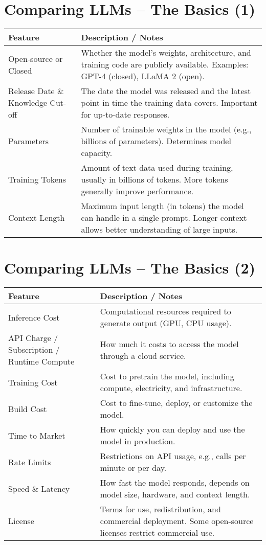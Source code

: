 \documentclass[a4paper, 12pt]{article}
\begin{document}
\section*{Comparing LLMs -- The Basics (1)}

\begin{tabularx}{\textwidth}{|>{\hsize}L|>{\hsize}L|}
\hline
\textbf{Feature} & \textbf{Description / Notes} \\
\hline
Open-source or Closed & Whether the model’s weights, architecture, and training code are publicly available. Examples: GPT-4 (closed), LLaMA 2 (open). \\
\hline
Release Date \& Knowledge Cut-off & The date the model was released and the latest point in time the training data covers. Important for up-to-date responses. \\
\hline
Parameters & Number of trainable weights in the model (e.g., billions of parameters). Determines model capacity. \\
\hline
Training Tokens & Amount of text data used during training, usually in billions of tokens. More tokens generally improve performance. \\
\hline
Context Length & Maximum input length (in tokens) the model can handle in a single prompt. Longer context allows better understanding of large inputs. \\
\hline
\end{tabularx}

\vspace{1em}

\section*{Comparing LLMs -- The Basics (2)}

\begin{tabularx}{\textwidth}{|>{\hsize}L|>{\hsize}L|}
\hline
\textbf{Feature} & \textbf{Description / Notes} \\
\hline
Inference Cost & Computational resources required to generate output (GPU, CPU usage). \\
\hline
API Charge / Subscription / Runtime Compute & How much it costs to access the model through a cloud service. \\
\hline
Training Cost & Cost to pretrain the model, including compute, electricity, and infrastructure. \\
\hline
Build Cost & Cost to fine-tune, deploy, or customize the model. \\
\hline
Time to Market & How quickly you can deploy and use the model in production. \\
\hline
Rate Limits & Restrictions on API usage, e.g., calls per minute or per day. \\
\hline
Speed \& Latency & How fast the model responds, depends on model size, hardware, and context length. \\
\hline
License & Terms for use, redistribution, and commercial deployment. Some open-source licenses restrict commercial use. \\
\hline
\end{tabularx}
\end{document}
